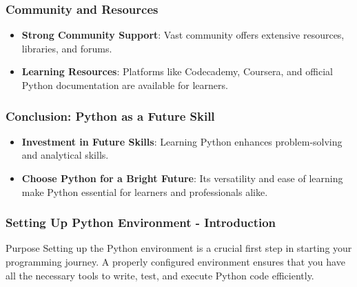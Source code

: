 \documentclass{beamer}
\begin{document}
\begin{frame}[fragile]
    \frametitle{Community and Resources}
    \begin{itemize}
        \item \textbf{Strong Community Support}: Vast community offers extensive resources, libraries, and forums.
        \item \textbf{Learning Resources}: Platforms like Codecademy, Coursera, and official Python documentation are available for learners.
    \end{itemize}
\end{frame}

\begin{frame}[fragile]
    \frametitle{Conclusion: Python as a Future Skill}
    \begin{itemize}
        \item \textbf{Investment in Future Skills}: Learning Python enhances problem-solving and analytical skills.
        \item \textbf{Choose Python for a Bright Future}: Its versatility and ease of learning make Python essential for learners and professionals alike.
    \end{itemize}
\end{frame}

\begin{frame}[fragile]
    \frametitle{Setting Up Python Environment - Introduction}
    \begin{block}{Purpose}
        Setting up the Python environment is a crucial first step in starting your programming journey. A properly configured environment ensures that you have all the necessary tools to write, test, and execute Python code efficiently.
    \end{block}
\end{frame}
\end{document}

